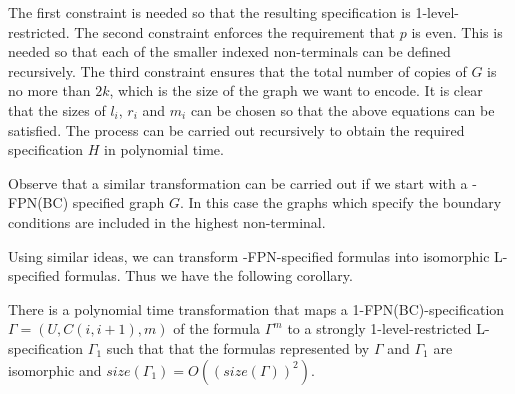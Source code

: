 The first constraint is needed so that the resulting specification is 
1-level-restricted. The second constraint enforces the requirement
that $p$ is even. This is needed 
so that each of the smaller indexed non-terminals  
can be defined recursively. 
The third constraint ensures that the 
total number of copies of $G$ is no more than $2k$, which is the size of the
graph we want to encode. It is clear that the sizes of $l_i$, 
$r_i$ and $m_i$ can be chosen  so that the above equations can be satisfied.
The process can be
carried out recursively to obtain the required specification $H$
in polynomial time.

Observe that a similar transformation can be carried out if we start
with a {-FPN(BC)} specified graph $G$. 
In this case the graphs which specify the boundary conditions
are included in the highest non-terminal. \hfill\QED

\smallskip

Using similar ideas, we can transform {-FPN}-specified formulas into
isomorphic {\sf L}-specified formulas. Thus we have the following corollary.


\begin{corollary}\label{cor:translate}
There is a polynomial time transformation that maps a 
1-FPN(BC)-specification $\Gamma = (U, C(i, i+1), m)$ of the formula $\Gamma^m$ 
to a strongly 1-level-restricted 
L-specification $\Gamma_1$ such that
that the formulas represented by $\Gamma$ and $\Gamma_1$ are isomorphic and
$size(\Gamma_1)= O((size(\Gamma))^2)$.
\end{corollary}
